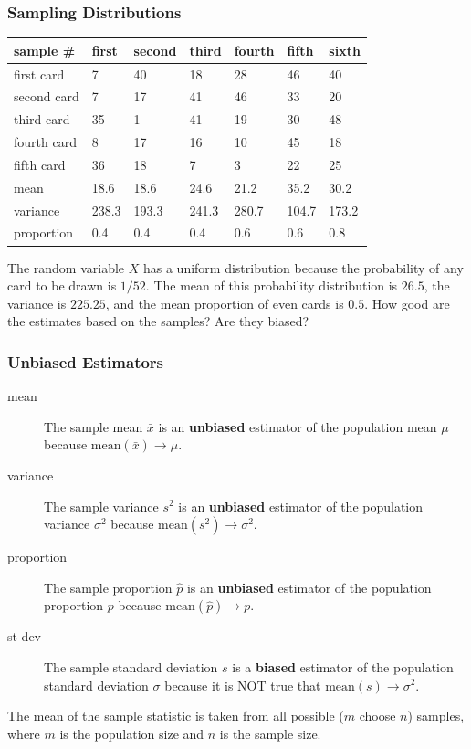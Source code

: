 \documentclass[xcolor=dvipsnames]{beamer}
\begin{document}
\begin{frame}
  \frametitle{Sampling Distributions}
\begin{tabular}{|l|l|l|l|l|l|l|}\hline
  sample \#   & first & second & third & fourth & fifth & sixth \\ \hline
  first card  & 7     & 40     & 18    & 28     & 46    & 40    \\ \hline
  second card & 7     & 17     & 41    & 46     & 33    & 20    \\ \hline
  third card  & 35    & 1      & 41    & 19     & 30    & 48    \\ \hline
  fourth card & 8     & 17     & 16    & 10     & 45    & 18    \\ \hline
  fifth card  & 36    & 18     & 7     & 3      & 22    & 25    \\ \hline
  mean        & 18.6  & 18.6   & 24.6  & 21.2   & 35.2  & 30.2  \\ \hline
  variance    & 238.3 & 193.3  & 241.3 & 280.7  & 104.7 & 173.2 \\ \hline
  proportion  & 0.4   & 0.4    & 0.4   & 0.6    & 0.6   & 0.8   \\ \hline
\end{tabular}

\medskip

The random variable $X$ has a \alert{uniform distribution} because
the probability of any card to be drawn is $1/52$. The mean of
this probability distribution is $26.5$, the variance is $225.25$,
and the mean proportion of even cards is $0.5$. How good are the
estimates based on the samples? Are they biased?
\end{frame}

\begin{frame}
  \frametitle{Unbiased Estimators}
  \begin{description}
  \item[mean] The \alert{sample mean $\bar{x}$} is an \textbf{unbiased}
    estimator of the \alert{population mean $\mu$} because
  $\mbox{mean}(\bar{x})\longrightarrow\mu$.
\item[variance] The \alert{sample variance $s^{2}$} is an \textbf{unbiased}
    estimator of the \alert{population variance $\sigma^{2}$} because
  $\mbox{mean}(s^{2})\longrightarrow\sigma^{2}$.
\item[proportion] The \alert{sample proportion $\hat{p}$} is an \textbf{unbiased}
    estimator of the \alert{population proportion $p$} because
  $\mbox{mean}(\hat{p})\longrightarrow{}p$.
\item[st dev] The \alert{sample standard deviation $s$} is a
  \textbf{biased} estimator of the \alert{population standard
    deviation $\sigma$} because it is NOT true that
  $\mbox{mean}(s)\longrightarrow\sigma^{2}$.
  \end{description}
  The mean of the sample statistic is taken from all possible ($m$
  choose $n$) samples, where $m$ is the population size and $n$ is the
  sample size.
\end{frame}
\end{document}
